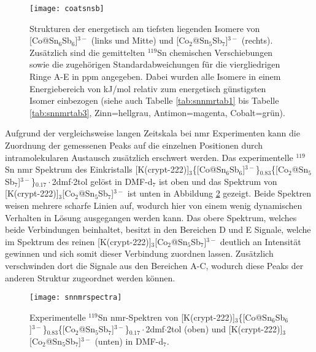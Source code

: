 \begin{figure}[ht!]
	\centering
	\texttt{[image: coatsnsb]}
	\captionsetup{figurewithin = chapter}
	\captionsetup{font=small, labelfont=bf}\caption[Strukturen von {[Co@Sn$_6$Sb$_6$]$^{3-}$ und [Co$_2$@Sn$_5$Sb$_7$]$^{3-}$}]{Strukturen der energetisch am tiefsten liegenden Isomere von [Co@Sn$_6$Sb$_6$]$^{3-}$ (links und Mitte) und [Co$_2$@Sn$_5$Sb$_7$]$^{3-}$ (rechts). Zusätzlich sind die gemittelten $^{119}$Sn chemischen Verschiebungen sowie die zugehörigen Standardabweichungen für die viergliedrigen Ringe A-E in ppm angegeben. Dabei wurden alle Isomere in einem Energiebereich von \unit[10]{kJ/mol} relativ zum energetisch günstigsten Isomer einbezogen (siehe auch Tabelle \ref{tab:snnmrtab1} bis Tabelle \ref{tab:snnmrtab3}, Zinn=hellgrau, Antimon=magenta, Cobalt=grün).}
\label{abb:coatsnsb}
\end{figure}
\FloatBarrier
Aufgrund der vergleichsweise langen Zeitskala bei \ac{nmr} Experimenten kann die Zuordnung der gemessenen Peaks auf die einzelnen Positionen durch intramolekularen Austausch zusätzlich erschwert werden. Das experimentelle $^{119}$Sn \ac{nmr} Spektrum des Einkristalls [K(crypt-222)]$_3$\{[Co@Sn$_6$Sb$_6$]$^{3-}$\}$_{0.83}$\{[Co$_2$@Sn$_5$Sb$_7$]$^{3-}$\}$_{0.17}\cdot$2dmf$\cdot$2tol gelöst in DMF-d$_7$ ist oben und das Spektrum von [K(crypt-222)]$_3$[Co$_2$@Sn$_5$Sb$_7$]$^{3-}$ ist unten in Abbildung \ref{abb:expsnnmr} gezeigt. Beide Spektren weisen mehrere scharfe Linien auf, wodurch hier von einem wenig dynamischen Verhalten in Lösung ausgegangen werden kann. Das obere Spektrum, welches beide Verbindungen beinhaltet, besitzt in den Bereichen D und E Signale, welche im Spektrum des reinen [K(crypt-222)]$_3$[Co$_2$@Sn$_5$Sb$_7$]$^{3-}$ deutlich an Intensität gewinnen und sich somit dieser Verbindung zuordnen lassen. Zusätzlich verschwinden dort die Signale aus den Bereichen A-C, wodurch diese Peaks der anderen Struktur zugeordnet werden können. 
\begin{figure}[ht!]
	\centering
	\texttt{[image: snnmrspectra]}
	\captionsetup{figurewithin = chapter}
	\captionsetup{font=small, labelfont=bf}\caption[{$^{119}$Sn \ac{nmr}-Spektren von [Co@Sn$_6$Sb$_6$]$^{3-}$ und [Co$_2$@Sn$_5$Sb$_7$]$^{3-}$}]{Experimentelle $^{119}$Sn \ac{nmr}-Spektren von [K(crypt-222)]$_3$\{[Co@Sn$_6$Sb$_6$]$^{3-}$\}$_{0.83}$\{[Co$_2$@Sn$_5$Sb$_7$]$^{3-}$\}$_{0.17}\cdot$2dmf$\cdot$2tol (oben) und [K(crypt-222)]$_3$[Co$_2$@Sn$_5$Sb$_7$]$^{3-}$ (unten) in DMF-d$_7$.}
\label{abb:expsnnmr}
\end{figure}
\FloatBarrier

